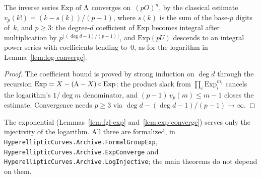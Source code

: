 \begin{lemma}
\label{lem:exp-converge}
\leanok
{}
The inverse series $\mathrm{Exp}$ of $\Lambda$ converges on~$(pO)^n$, by the classical
estimate $v_p(k!) = (k - s(k))/(p-1)$, where $s(k)$ is the sum of the base-$p$ digits
of~$k$, and $p \ge 3$: the degree-$d$ coefficient of $\mathrm{Exp}$ becomes integral after
multiplication by $p^{\lfloor (\deg d - 1)/(p-1) \rfloor}$, and $\mathrm{Exp}(pU)$
descends to an integral power series with coefficients tending to~$0$, as for the
logarithm in Lemma~\ref{lem:log-converge}.
\end{lemma}
\begin{proof}
\leanok
The coefficient bound is proved by strong induction on $\deg d$ through the recursion
$\mathrm{Exp} = X - (\Lambda - X)\circ\mathrm{Exp}$: the product slack from
$\prod_i \mathrm{Exp}_i^{m_i}$ cancels the logarithm's $1/\deg m$ denominator, and
$(p-1)\,v_p(m) \le m - 1$ closes the estimate. Convergence needs $p \ge 3$ via
$\deg d - (\deg d - 1)/(p-1) \to \infty$.
\end{proof}

\begin{remark}[Formalization]
The exponential (Lemmas~\ref{lem:fgl-exp} and~\ref{lem:exp-converge}) serves only the
injectivity of the logarithm. All three are formalized, in
\texttt{HyperellipticCurves.Archive.FormalGroupExp},
\texttt{HyperellipticCurves.Archive.ExpConverge} and
\texttt{HyperellipticCurves.Archive.LogInjective}; the main theorems do not depend on them.
\end{remark}


